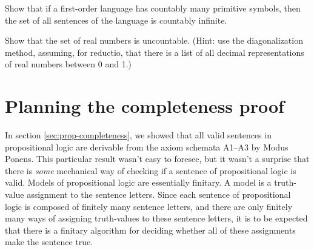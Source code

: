 
\begin{exercise}
  Show that if a first-order language has countably many primitive symbols,
  then the set of all sentences of the language is countably infinite.
\end{exercise}

\begin{exercise}
  Show that the set of real numbers is uncountable.
  (Hint: use the diagonalization method,
  assuming, for reductio, that there is a list of all
  decimal representations of real numbers between 0 and 1.)
\end{exercise}


\section{Planning the completeness proof}

In section \ref{sec:prop-completeness},
we showed that all valid sentences in propositional logic
are derivable from the axiom schemata A1--A3 by Modus Ponens.
This particular result wasn't easy to foresee,
but it wasn't a surprise that
there is \emph{some} mechanical way of checking if
a sentence of propositional logic is valid.
Models of propositional logic are essentially finitary.
A model is a truth-value assignment to the sentence letters.
Since each sentence of propositional logic is composed of finitely many sentence letters,
and there are only finitely many ways of assigning truth-values to these sentence letters,
it is to be expected that
there is a finitary algorithm for deciding whether all
of these assignments make the sentence true.


